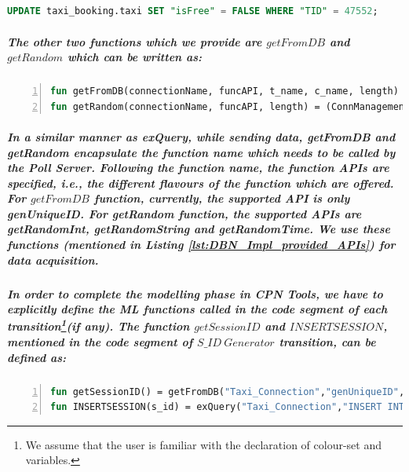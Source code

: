 \subparagraph*{}
\begin{lstlisting}[showstringspaces=false, language = SQL, caption = RESERVE action: query example, captionpos=b, label = lst:DBN_Impl_RESERVE_action_query_ex]
UPDATE taxi_booking.taxi SET "isFree" = FALSE WHERE "TID" = 47552;
\end{lstlisting}

\subparagraph*{\textnormal{The other two functions which we provide are $\mathit{getFromDB}$ and $\mathit{getRandom}$ which can be written as:}}

\subparagraph*{}
\begin{lstlisting}[showstringspaces=false, language = ML, caption = \textit{getRandom} and \textit{getFromDB} function, captionpos=b, label = lst:DBN_Impl_provided_APIs, numbers=left,
stepnumber=1]
fun getFromDB(connectionName, funcAPI, t_name, c_name, length) = (ConnManagementLayer.send(connectionName, "getFromDB"^"?"^t_name^"?"^c_name^"?"^funcAPI^"?"^length, stringEncode); ConnManagementLayer.receive(connectionName, stringDecode));
fun getRandom(connectionName, funcAPI, length) = (ConnManagementLayer.send(connectionName, "getRandom"^"?"^funcAPI^"?"^length, stringEncode); ConnManagementLayer.receive(connectionName, stringDecode));
\end{lstlisting}

\subparagraph*{\textnormal{In a similar manner as \textit{exQuery}, while sending data, \textit{getFromDB} and \textit{getRandom} encapsulate the function name which needs to be called by the \textit{Poll Server}. Following the function name, the function APIs are specified, i.e., the different flavours of the function which are offered. For $\mathit{getFromDB}$ function, currently, the supported API is only \textit{genUniqueID}. For \textit{getRandom} function, the supported APIs are \textit{getRandomInt}, \textit{getRandomString} and \textit{getRandomTime}. We use these functions (mentioned in Listing \ref{lst:DBN_Impl_provided_APIs}) for data acquisition.}}

\subparagraph*{\textnormal{In order to complete the modelling phase in CPN Tools, we have to explicitly define the ML functions called in the code segment of each transition\footnote{We assume that the user is familiar with the declaration of colour-set and variables.}(if any). The function $\mathit{getSessionID}$ and $\mathit{INSERTSESSION}$, mentioned in the code segment of $\mathit{S\_ID\ Generator}$ transition, can be defined as:}}

\subparagraph*{}
\begin{lstlisting}[showstringspaces=false, language = ML, caption = Functions for generating and inserting session ID, captionpos=b, label = lst:DBN_Impl_functions_SID_Gen,numbers=left,
stepnumber=1]
fun getSessionID() = getFromDB("Taxi_Connection","genUniqueID","taxi_booking.session","\"SID\"","6");
fun INSERTSESSION(s_id) = exQuery("Taxi_Connection","INSERT INTO taxi_booking.session VALUES ("^ s_id ^ ");" );
\end{lstlisting}

